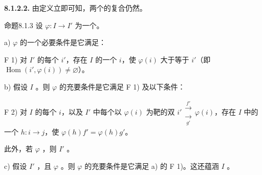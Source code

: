 \textbf{8.1.2.2.} 由定义立即可知，两个的复合仍然。
\begin{SGAresult}{命题}{8.1.3}
设 $\varphi:I\to I'$ 为一个。

 a) $\varphi$ 的一个必要条件是它满足：

 F 1) 对 $I'$ 的每个 $i'$，存在 $I$ 的一个 $i$，使 $\varphi(i)$ 大于等于 $i'$（即 $\operatorname{Hom}(i',\varphi(i))\ne\varnothing$）。

 b) 假设 $I$ 。则 $\varphi$ 的充要条件是它满足 F 1) 及以下条件：

 F 2) 对 $I$ 的每个 $i$，以及 $I'$ 中每个以 $\varphi(i)$ 为靶的双 $i'\mathrel{\substack{\xrightarrow{f'}\\[-.6ex]\xrightarrow[g']{}}}\varphi(i)$，存在 $I$ 中的一个 $h:i\to j$，使 $\varphi(h)f'=\varphi(h)g'$。

此外，若 $\varphi$ ，则 $I'$ 。

 c) 假设 $I'$ ，且 $\varphi$ 。则 $\varphi$ 的充要条件是它满足 a) 的 F 1)。这还蕴涵 $I$ 。
\end{SGAresult}

